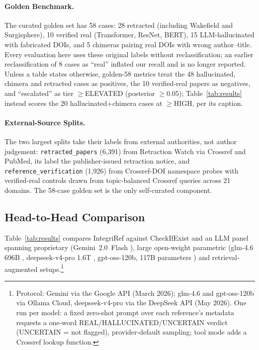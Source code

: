 \documentclass[runningheads]{llncs}
\begin{document}
\paragraph{Golden Benchmark.}
The curated golden set has 58 cases: 28 retracted (including Wakefield and Surgisphere), 10 verified real (Transformer, ResNet, BERT), 15 LLM-hallucinated with fabricated DOIs, and 5 chimeras pairing real DOIs with wrong author--title. Every evaluation here uses these original labels without reclassification; an earlier reclassification of 8 cases as ``real'' inflated our recall and is no longer reported. Unless a table states otherwise, golden-58 metrics treat the 48 hallucinated, chimera and retracted cases as positives, the 10 verified-real papers as negatives, and ``escalated'' as tier $\geq$ELEVATED (posterior $\geq$0.05); Table~\ref{tab:results} instead scores the 20 hallucinated+chimera cases at $\geq$HIGH, per its caption.

\paragraph{External-Source Splits.}
\label{par:external}
The two largest splits take their labels from external authorities, not author judgement: \texttt{retracted\_papers} (6{,}391) from Retraction Watch via Crossref and PubMed, its label the publisher-issued retraction notice, and \texttt{reference\_verification} (1{,}926) from Crossref-DOI namespace probes with verified-real controls drawn from topic-balanced Crossref queries across 21 domains. The 58-case golden set is the only self-curated component.

\subsection{Head-to-Head Comparison}

Table~\ref{tab:results} compares IntegriRef against CheckIfExist \cite{abbonato2026checkifexist} and an LLM panel spanning proprietary (Gemini~2.0~Flash \cite{google2024gemini2}), large open-weight parametric (glm-4.6 696B \cite{glm2025arc}, deepseek-v4-pro 1.6T \cite{deepseek2026v4pro}, gpt-oss-120b, 117B parameters \cite{openai2025gptoss}) and retrieval-augmented setups.\footnote{Protocol: Gemini via the Google API (March 2026); glm-4.6 and gpt-oss-120b via Ollama Cloud, deepseek-v4-pro via the DeepSeek API (May 2026). One run per model: a fixed zero-shot prompt over each reference's metadata requests a one-word REAL/HALLUCINATED/UNCERTAIN verdict (UNCERTAIN = not flagged), provider-default sampling; tool mode adds a Crossref lookup function.}
\end{document}
